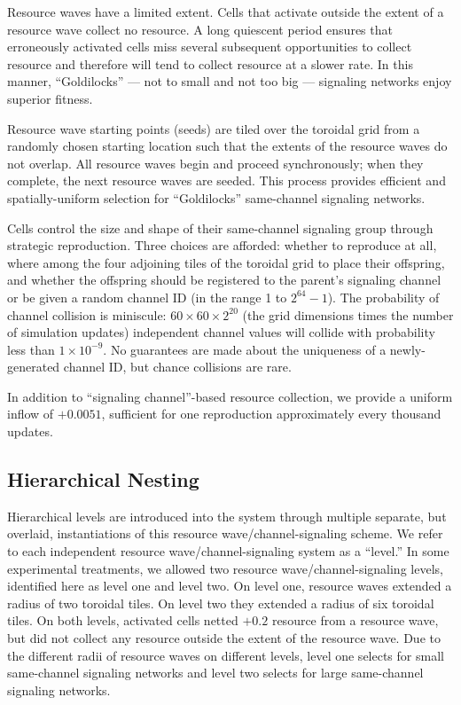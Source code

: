 Resource waves have a limited extent.
Cells that activate outside the extent of a resource wave collect no resource.
A long quiescent period ensures that erroneously activated cells miss several subsequent opportunities to collect resource and therefore will tend to collect resource at a slower rate.
In this manner, ``Goldilocks'' --- not to small and not too big --- signaling networks enjoy superior fitness.

Resource wave starting points (seeds) are tiled over the toroidal grid from a randomly chosen starting location such that the extents of the resource waves do not overlap.
All resource waves begin and proceed synchronously;
when they complete, the next resource waves are seeded.
This process provides efficient and spatially-uniform selection for ``Goldilocks'' same-channel signaling networks.

Cells control the size and shape of their same-channel signaling group through strategic reproduction.
Three choices are afforded: whether to reproduce at all, where among the four adjoining tiles of the toroidal grid to place their offspring, and whether the offspring should be registered to the parent's signaling channel or be given a random channel ID (in the range 1 to $2^{64} - 1$).
The probability of channel collision is miniscule: $60 \times 60 \times 2^{20}$ (the grid dimensions times the number of simulation updates) independent channel values will collide with probability less than $1 \times 10^{-9}$.
No guarantees are made about the uniqueness of a newly-generated channel ID, but chance collisions are rare.

In addition to ``signaling channel''-based resource collection, we provide a uniform inflow of $+0.0051$, sufficient for one reproduction approximately every thousand updates.

\subsection{Hierarchical Nesting} \label{sup:hierarchical_nesting}

Hierarchical levels are introduced into the system through multiple separate, but overlaid, instantiations of this resource wave/channel-signaling scheme.
We refer to each independent resource wave/channel-signaling system as a ``level.''
In some experimental treatments, we allowed two resource wave/channel-signaling levels, identified here as level one and level two.
On level one, resource waves extended a radius of two toroidal tiles.
On level two they extended a radius of six toroidal tiles.
On both levels, activated cells netted $+0.2$ resource from a resource wave, but did not collect any resource outside the extent of the resource wave.
Due to the different radii of resource waves on different levels, level one selects for small same-channel signaling networks and level two selects for large same-channel signaling networks.


